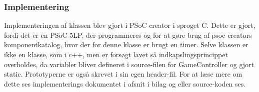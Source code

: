 \documentclass[Rapport/Playerside/GameController/GameController.tex]{subfiles}
\begin{document}
\subsubsection{Implementering}
Implementeringen af klassen blev gjort i PSoC creator i sproget C. Dette er gjort, fordi det er en PSoC 5LP, der programmeres og for at gøre brug af psoc creators komponentkatalog, hvor der for denne klasse er brugt en timer. Selve klassen er ikke en klasse, som i c++, men er forsøgt lavet så indkapslingsprincippet overholdes, da variabler bliver defineret i source-filen for GameController og gjort static. Prototyperne er også skrevet i sin egen header-fil. For at læse mere om dette ses implementerings dokumentet i afsnit  i bilag og eller source-koden ses. 
\end{document}
